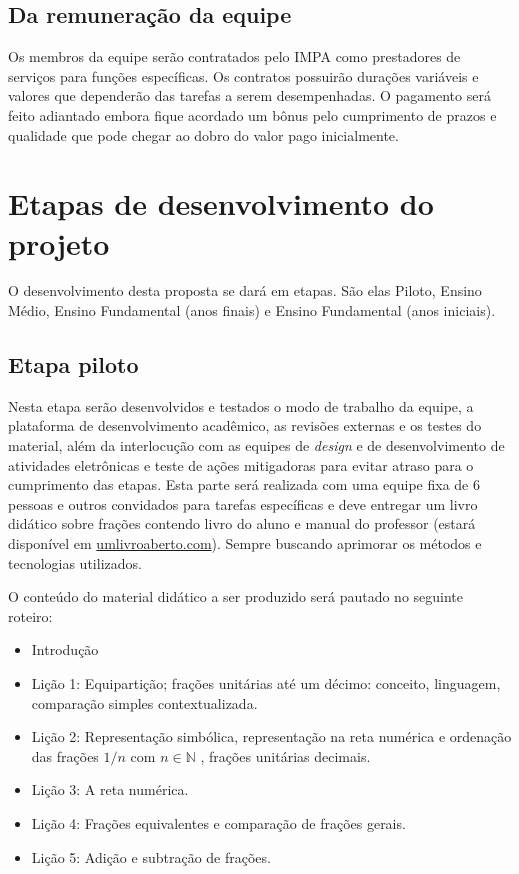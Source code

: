 \documentclass[10 pt]{article}
\begin{document}
\subsection{Da remuneração da equipe}

Os membros da equipe serão contratados pelo IMPA como prestadores de serviços para funções específicas. 
Os contratos possuirão durações variáveis e valores que dependerão das tarefas a serem desempenhadas.
O pagamento será feito adiantado embora fique acordado um bônus pelo cumprimento de prazos e qualidade que pode chegar ao dobro do valor pago inicialmente.


\section{Etapas de desenvolvimento do projeto}
O desenvolvimento desta proposta se dará em etapas. São elas Piloto, Ensino Médio, Ensino Fundamental (anos finais) e Ensino Fundamental (anos iniciais).

\subsection{Etapa piloto}

Nesta etapa serão desenvolvidos e testados o modo de trabalho da equipe, a plataforma de desenvolvimento acadêmico, as revisões externas e os testes do material, além da interlocução com as equipes de {\it design} e de desenvolvimento de atividades eletrônicas e teste de ações mitigadoras para evitar atraso para o cumprimento das etapas. 
Esta parte será realizada com uma equipe fixa de 6 pessoas e outros convidados para tarefas específicas e deve entregar um livro didático sobre frações contendo livro do aluno e manual do professor (estará disponível em \url{umlivroaberto.com}). 
Sempre buscando aprimorar os métodos e tecnologias utilizados.

O conteúdo do material didático a ser produzido será pautado no seguinte roteiro:

\begin{itemize} %
  \item     Introdução
  \item     Lição 1: Equipartição; frações unitárias até um décimo: conceito, linguagem, comparação simples contextualizada.
  \item     Lição 2: Representação simbólica, representação na reta numérica e ordenação das frações     $1/n$  com  $n \in \mathbb{N}$    , frações unitárias decimais.
  \item     Lição 3: A reta numérica.
  \item     Lição 4: Frações equivalentes e comparação de frações gerais.
  \item     Lição 5: Adição e subtração de frações.
\end{itemize} %
\end{document}
